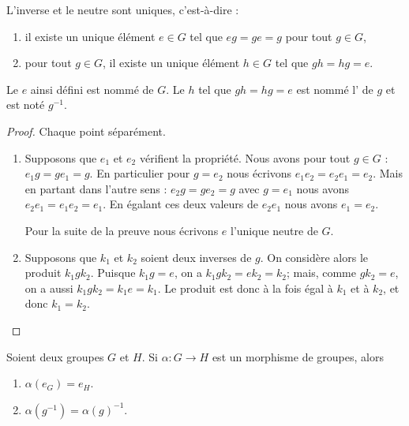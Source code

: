 \begin{lemmaDef}[Unicités]  \label{LEMooECDMooCkWxXf}
    L'inverse et le neutre sont uniques, c'est-à-dire :
    \begin{enumerate}
        \item
            il existe un unique élément \( e\in G\) tel que \( e g=g e=g\) pour tout \( g\in G\),
        \item       \label{ITEMooOIWTooYqmMPP}
            pour tout \( g\in G\), il existe un unique élément \( h\in  G\) tel que \(g h=h g=e \).
    \end{enumerate}
    Le \( e\) ainsi défini est nommé  de \( G\). Le \( h\) tel que \( g h=h g=e\) est nommé l' de \( g\) et est noté \( g^{-1}\).
\end{lemmaDef}

\begin{proof}
    Chaque point séparément.
    \begin{enumerate}
        \item
            Supposons que \( e_1\) et \( e_2\) vérifient la propriété. Nous avons pour tout \( g\in G\) : \( e_1g=ge_1=g\). En particulier pour \( g=e_2\) nous écrivons \( e_1e_2=e_2e_1=e_2\). Mais en partant dans l'autre sens : \( e_2g=ge_2=g\) avec \( g=e_1\) nous avons \( e_2e_1=e_1e_2=e_1\). En égalant ces deux valeurs de \( e_2e_1\) nous avons \( e_1=e_2\).

            Pour la suite de la preuve nous écrivons \( e\) l'unique neutre de \( G\).

        \item
            Supposons que \( k_1\) et \( k_2\) soient deux inverses de \( g\). On considère alors le produit \( k_1 g k_2 \). Puisque \(k_1 g = e \), on a \( k_1 g k_2 = e k_2 = k_2 \); mais, comme \(g k_2 = e \), on a aussi \( k_1 g k_2 = k_1 e = k_1 \). Le produit est donc à la fois égal à \( k_1 \) et à \( k_2 \), et donc \( k_1 = k_2 \).
    \end{enumerate}
\end{proof}

\begin{lemma}       \label{LEMooWYLRooNOdZnp}
    Soient deux groupes \( G\) et \( H\). Si \( \alpha\colon G\to H\) est un morphisme de groupes, alors
    \begin{enumerate}
        \item
            \( \alpha(e_G)=e_H\).
        \item
            \( \alpha(g^{-1})=\alpha(g)^{-1}\).
    \end{enumerate}
\end{lemma}

